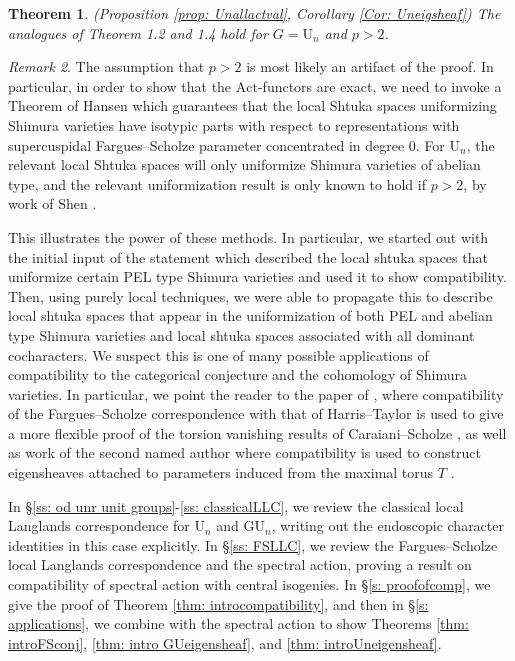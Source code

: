 \documentclass[reqno,11pt]{amsart}
\newtheorem{theorem}{Theorem}[section]
\theoremstyle{remark}
\newtheorem{remark}[theorem]{Remark}
\newcommand{\GU}{\mathrm{GU}}
\newcommand{\U}{\mathrm{U}}
\newcommand{\Act}{\mathrm{Act}}
\begin{document}
\begin{theorem}{(Proposition \ref{prop: Unallactval}, Corollary \ref{Cor: Uneigsheaf})}{\label{thm: introUneigensheaf}}
The analogues of Theorem 1.2 and 1.4 hold for $G = \U_{n}$ and $p > 2$. 
\end{theorem}
\begin{remark}
The assumption that $p > 2$ is most likely an artifact of the proof. In particular, in order to show that the $\Act$-functors are exact, we need to invoke a Theorem of  Hansen \cite[Theorem~1.1]{Han} which guarantees that the local Shtuka spaces uniformizing Shimura varieties have isotypic parts with respect to representations with supercuspidal Fargues--Scholze parameter concentrated in degree $0$. For $\U_{n}$, the relevant local Shtuka spaces will only uniformize Shimura varieties of abelian type, and the relevant uniformization result is only known to hold if $p > 2$, by work of Shen \cite{Shen}.
\end{remark} 
This illustrates the power of these methods. In particular, we started out with the initial input of the statement \cite[Theorem~6.1]{BMN} which described the local shtuka spaces that uniformize certain PEL type Shimura varieties and used it to show compatibility. Then, using purely local techniques, we were able to propagate this to  describe local shtuka spaces that appear in the uniformization of both PEL and abelian type Shimura varieties and local shtuka spaces associated with all dominant cocharacters. We suspect this is one of many possible applications of compatibility to the categorical conjecture and the cohomology of Shimura varieties.  In particular, we point the reader to the paper of \cite{Ko1}, where compatibility of the Fargues--Scholze correspondence with that of Harris--Taylor is used to give a more flexible proof of the torsion vanishing results of Caraiani--Scholze \cite{CS,CS1}, as well as work of the second named author where compatibility is used to construct eigensheaves attached to parameters induced from the maximal torus $T$ \cite{Ham1}.

In \S \ref{ss: od unr unit groups}-\ref{ss: classicalLLC}, we review the classical local Langlands correspondence for $\U_{n}$ and $\GU_{n}$, writing out the endoscopic character identities in this case explicitly. In \S \ref{ss: FSLLC}, we review the Fargues--Scholze local Langlands correspondence and the spectral action, proving a result on compatibility of spectral action with central isogenies. In \S \ref{s: proofofcomp}, we give the proof of Theorem \ref{thm: introcompatibility}, and then in \S \ref{s: applications}, we combine with the spectral action to show Theorems \ref{thm: introFSconj}, \ref{thm: intro GUeigensheaf}, and \ref{thm: introUneigensheaf}. 
\end{document}
